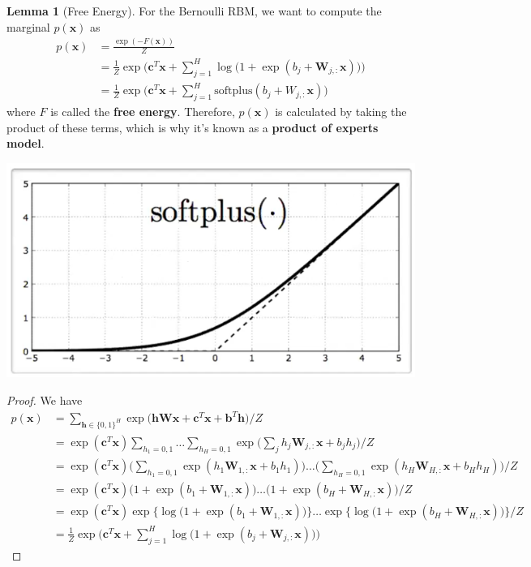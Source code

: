\documentclass{article}
\theoremstyle{definition}
\newtheorem{lemma}[theorem]{Lemma}
\theoremstyle{remark}
\theoremstyle{definition}
\begin{document}
\begin{lemma}[Free Energy] 
    For the Bernoulli RBM, we want to compute the marginal $p(\mathbf{x})$ as
\begin{align*} 
    p(\mathbf{x}) & = \frac{\exp(-F(\mathbf{x}))}{Z} \\
                  & = \frac{1}{Z} \exp \bigg( \mathbf{c}^T \mathbf{x} + \sum_{j=1}^H \log \big( 1 + \exp (b_j + \mathbf{W}_{j, :} \mathbf{x}) \big) \bigg) \\
                  & = \frac{1}{Z} \exp \bigg( \mathbf{c}^T \mathbf{x} + \sum_{j=1}^H \mathrm{softplus}(b_j + W_{j, :} \mathbf{x} ) \bigg)
\end{align*}
where $F$ is called the \textbf{free energy}. Therefore, $p(\mathbf{x})$ is calculated by taking the product of these terms, which is why it's known as a \textbf{product of experts model}. 
\begin{center}
    \includegraphics[scale=0.4]{Images/softplus.png} 
\end{center}
\end{lemma}
\begin{proof}
We have 
\begin{align*} 
    p(\mathbf{x}) & = \sum_{\mathbf{h} \in \{0, 1\}^H} \exp \big( \mathbf{h} \mathbf{W} \mathbf{x} + \mathbf{c}^T \mathbf{x} + \mathbf{b}^T \mathbf{h}\big) /Z \\
                  & = \exp (\mathbf{c}^T \mathbf{x}) \sum_{h_1 = 0, 1} \ldots \sum_{h_H = 0, 1} \exp \bigg( \sum_j h_j \mathbf{W}_{j, :} \mathbf{x} + b_j h_j \bigg) / Z \\
                  & = \exp (\mathbf{c}^T \mathbf{x}) \bigg( \sum_{h_1 = 0, 1} \exp (h_1 \mathbf{W}_{1, :} \mathbf{x} + b_1 h_1 ) \bigg) \ldots \bigg( \sum_{h_H = 0, 1} \exp (h_H \mathbf{W}_{H, :} \mathbf{x} + b_H h_H) \bigg) / Z \\
                  & = \exp (\mathbf{c}^T \mathbf{x}) \big( 1 + \exp (b_1 + \mathbf{W}_{1, :} \mathbf{x}) \big) \ldots \big( 1 + \exp (b_H + \mathbf{W}_{H, :} \mathbf{x})\big) / Z \\
                  & = \exp (\mathbf{c}^T \mathbf{x}) \exp\big\{ \log \big( 1 + \exp (b_1 + \mathbf{W}_{1, :} \mathbf{x}) \big) \big\} \ldots \exp \big\{ \log \big( 1 + \exp (b_H + \mathbf{W}_{H, :} \mathbf{x}) \big) \big\} / Z \\
                  & = \frac{1}{Z} \exp \bigg( \mathbf{c}^T \mathbf{x} + \sum_{j=1}^H \log \big( 1 + \exp (b_j + \mathbf{W}_{j, :} \mathbf{x}) \big) \bigg) 
\end{align*} 
\end{proof}
\end{document}
